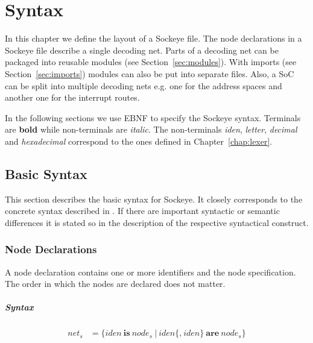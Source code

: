 \documentclass[a4paper,11pt,twoside]{report}
\begin{document}
{{{\begin{description}
\end{description}


\chapter{Syntax}
\label{chap:declaration}

In this chapter we define the layout of a Sockeye file.
The node declarations in a Sockeye file describe a single decoding net.
Parts of a decoding net can be packaged into reusable modules (see Section~\ref{sec:modules}).
With imports (see Section~\ref{sec:imports}) modules can also be put into separate files.
Also, a SoC can be split into multiple decoding nets e.g. one for the address spaces and another one for the interrupt routes.

In the following sections we use EBNF to specify the Sockeye syntax. Terminals are \textbf{bold} while non-terminals are \textit{italic}.
The non-terminals \textit{iden}, \textit{letter}, \textit{decimal} and \textit{hexadecimal} correspond to the ones defined in Chapter~\ref{chap:lexer}.

\section{Basic Syntax}
This section describes the basic syntax for Sockeye.
It closely corresponds to the concrete syntax described in \cite{achermann:mars17}.
If there are important syntactic or semantic differences it is stated so in the description of the respective syntactical construct.

\subsection{Node Declarations}
A node declaration contains one or more identifiers and the node specification.
The order in which the nodes are declared does not matter.

\paragraph{Syntax}
\begin{align*}
\textit{net}_s & \mathop{=}
    \Big\{
        \textit{iden}\ \textbf{is}\ \textit{node}_s\
    \Big|\
        \textit{iden}\bigl\{\textbf{,}\ \textit{iden}\bigr\}\ \textbf{are}\ \textit{node}_s
    \Big\} \\
\end{align*}

}}}
\end{document}
